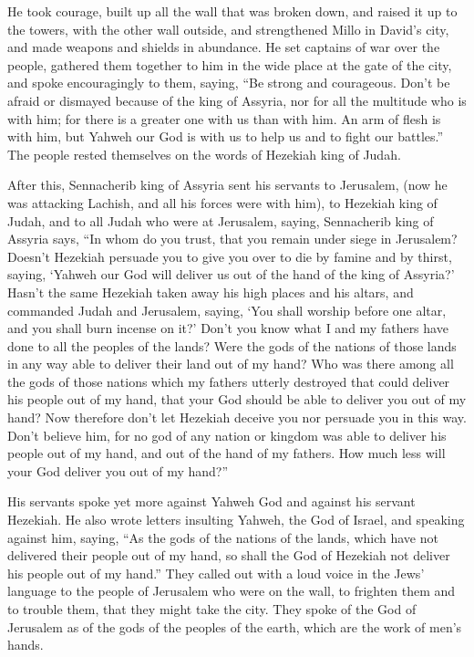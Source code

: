  He took courage, built up all the wall that was broken
down, and raised it up to the towers, with the other wall outside, and
strengthened Millo in David's city, and made weapons and shields in
abundance.  He set captains of war over the people,
gathered them together to him in the wide place at the gate of the city,
and spoke encouragingly to them, saying,  ``Be strong and
courageous. Don't be afraid or dismayed because of the king of Assyria,
nor for all the multitude who is with him; for there is a greater one
with us than with him.  An arm of flesh is with him, but
Yahweh our God is with us to help us and to fight our battles.'' The
people rested themselves on the words of Hezekiah king of Judah.

 After this, Sennacherib king of Assyria sent his servants
to Jerusalem, (now he was attacking Lachish, and all his forces were
with him), to Hezekiah king of Judah, and to all Judah who were at
Jerusalem, saying,  Sennacherib king of Assyria says,
``In whom do you trust, that you remain under siege in Jerusalem?
 Doesn't Hezekiah persuade you to give you over to die by
famine and by thirst, saying, `Yahweh our God will deliver us out of the
hand of the king of Assyria?'  Hasn't the same Hezekiah
taken away his high places and his altars, and commanded Judah and
Jerusalem, saying, `You shall worship before one altar, and you shall
burn incense on it?'  Don't you know what I and my
fathers have done to all the peoples of the lands? Were the gods of the
nations of those lands in any way able to deliver their land out of my
hand?  Who was there among all the gods of those nations
which my fathers utterly destroyed that could deliver his people out of
my hand, that your God should be able to deliver you out of my hand?
 Now therefore don't let Hezekiah deceive you nor
persuade you in this way. Don't believe him, for no god of any nation or
kingdom was able to deliver his people out of my hand, and out of the
hand of my fathers. How much less will your God deliver you out of my
hand?''

 His servants spoke yet more against Yahweh God and
against his servant Hezekiah.  He also wrote letters
insulting Yahweh, the God of Israel, and speaking against him, saying,
``As the gods of the nations of the lands, which have not delivered
their people out of my hand, so shall the God of Hezekiah not deliver
his people out of my hand.''  They called out with a loud
voice in the Jews' language to the people of Jerusalem who were on the
wall, to frighten them and to trouble them, that they might take the
city.  They spoke of the God of Jerusalem as of the gods
of the peoples of the earth, which are the work of men's hands.

